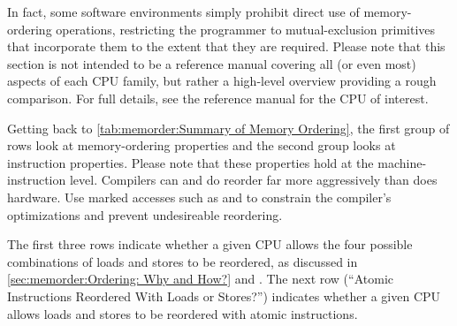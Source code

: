 \begin{table}[tb]
\vspace{5pt}\hfill
{}\OneColumnHSpace{-0.4in}
\caption{Summary of Memory Ordering}
\label{tab:memorder:Summary of Memory Ordering}
\end{table}

In fact, some software environments simply prohibit
direct use of memory-ordering operations, restricting the programmer
to mutual-exclusion primitives that incorporate them to the extent that
they are required.
Please note that this section is not intended to be a reference manual
covering all (or even most) aspects of each CPU family, but rather
a high-level overview providing a rough comparison.
For full details, see the reference manual for the CPU of interest.

Getting back to
\cref{tab:memorder:Summary of Memory Ordering},
the first group of rows look at memory-ordering
properties and the second group looks at instruction properties.
Please note that these properties hold at the machine-instruction
level.
Compilers can and do reorder far more aggressively than does hardware.
Use marked accesses such as  and 
to constrain the compiler's optimizations and prevent undesireable
reordering.

The first three rows indicate whether a given CPU allows the four
possible combinations of loads and stores to be reordered, as discussed
in
\cref{sec:memorder:Ordering: Why and How?} and
.
The next row (``Atomic Instructions Reordered With Loads or Stores?\@'')
indicates whether a given CPU allows loads and stores
to be reordered with atomic instructions.

